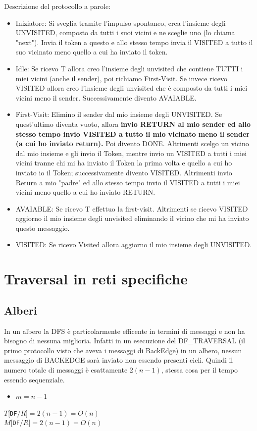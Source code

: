Descrizione del protocollo a parole:
\begin{itemize}
    \item Iniziatore: Si sveglia tramite l'impulso spontaneo, crea l'insieme degli
          UNVISITED, composto da tutti i suoi vicini e ne sceglie uno (lo chiama
          "next"). Invia il token a questo e allo stesso tempo invia il  VISITED a tutto
          il suo vicinato meno quello a cui ha inviato il token.
    \item Idle: Se ricevo T allora creo l'insieme degli unvisited che contiene
          TUTTI i miei vicini (anche il sender), poi richiamo First-Visit. Se
          invece ricevo VISITED allora creo l'insieme degli unvisited che è
          composto da tutti i miei vicini meno il sender. Successivamente divento
          AVAIABLE.
    \item First-Visit: Elimino il sender dal mio insieme degli UNVISITED. Se
          quest'ultimo diventa vuoto, allora \textbf{invio RETURN al mio sender ed allo
              stesso tempo invio VISITED a tutto il mio vicinato meno il sender (a cui ho
              inviato return).} Poi divento DONE. Altrimenti scelgo un vicino dal mio
          insieme e gli invio il Token, mentre invio un VISITED a tutti i miei vicini
          tranne chi mi ha inviato il Token la prima volta e quello a cui ho inviato io
          il Token; successivamente divento VISITED. Altrimenti invio Return a mio
          "padre" ed allo stesso tempo invio il VISITED a tutti i miei vicini meno
          quello a cui ho inviato RETURN.
    \item AVAIABLE: Se ricevo T effettuo la first-visit. Altrimenti se ricevo
          VISITED aggiorno il mio insieme degli unvisited eliminando il vicino che mi ha
          inviato questo messaggio.
    \item VISITED: Se ricevo Visited allora aggiorno il mio insieme degli
          UNVISITED.
\end{itemize}


\section{Traversal in reti specifiche}
\subsection{Alberi}
In un albero la DFS è particolarmente efficente in termini di messaggi e non ha
bisogno di nessuna miglioria. Infatti in un esecuzione del DF\_TRAVERSAL (il
primo protocollo visto che aveva i messaggi di BackEdge) in un albero, nessun
messaggio di BACKEDGE sarà inviato non essendo presenti cicli. Quindi il numero
totale di messaggi è esattamente $2(n-1)$, stessa cosa per il tempo essendo
sequenziale.
\begin{itemize}
    \item $m = n -1$
\end{itemize}
\begin{center}
    $T[$\texttt{DF}$/R] = 2(n-1) = O(n)$\\
    $M[$\texttt{DF}$/R] = 2(n-1) = O(n)$
\end{center}
